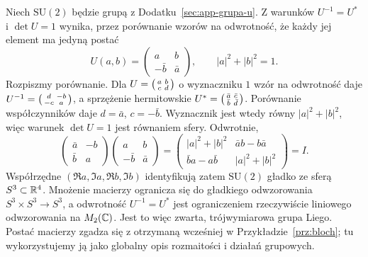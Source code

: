 \begin{przyklad}
\label{prz:su2-liego}
Niech $\mathrm{SU}(2)$ będzie grupą z
Dodatku~\ref{sec:app-grupa-u}.
Z warunków $U^{-1}=U^*$ i $\det U=1$ wynika, przez porównanie
wzorów na odwrotność, że każdy jej element ma jedyną postać
\begin{equation}\label{eq:su2-macierz}
 U(a,b)=\begin{pmatrix}a&b\\-\bar b&\bar a\end{pmatrix},
 \qquad |a|^2+|b|^2=1.
\end{equation}
Rozpiszmy porównanie. Dla $U=\begin{psmallmatrix}a&b\\c&d\end{psmallmatrix}$
o wyznaczniku $1$ wzór na odwrotność daje
$U^{-1}=\begin{psmallmatrix}d&-b\\-c&a\end{psmallmatrix}$,
a sprzężenie hermitowskie
$U^*=\begin{psmallmatrix}\bar a&\bar c\\\bar b&\bar d\end{psmallmatrix}$.
Porównanie współczynników daje $d=\bar a$, $c=-\bar b$.
Wyznacznik jest wtedy równy $|a|^2+|b|^2$, więc warunek
$\det U=1$ jest równaniem sfery.
Odwrotnie,
\[
 \begin{pmatrix}\bar a&-b\\\bar b&a\end{pmatrix}
 \begin{pmatrix}a&b\\-\bar b&\bar a\end{pmatrix}
 =
 \begin{pmatrix}|a|^2+|b|^2&\bar a b-b\bar a\\
                 \bar b a-a\bar b&|a|^2+|b|^2\end{pmatrix}=I.
\]
Współrzędne $(\Re a,\Im a,\Re b,\Im b)$ identyfikują zatem
$\mathrm{SU}(2)$ gładko ze sferą $S^3\subset\mathbb{R}^4$.
Mnożenie macierzy ogranicza się do gładkiego odwzorowania
$S^3\times S^3\to S^3$, a odwrotność $U^{-1}=U^*$ jest
ograniczeniem rzeczywiście liniowego odwzorowania na $M_2(\mathbb{C})$.
Jest to więc zwarta, trójwymiarowa grupa Liego.
Postać macierzy zgadza się z otrzymaną wcześniej w
Przykładzie~\ref{prz:bloch}; tu wykorzystujemy ją jako
globalny opis rozmaitości i działań grupowych.
\end{przyklad}

